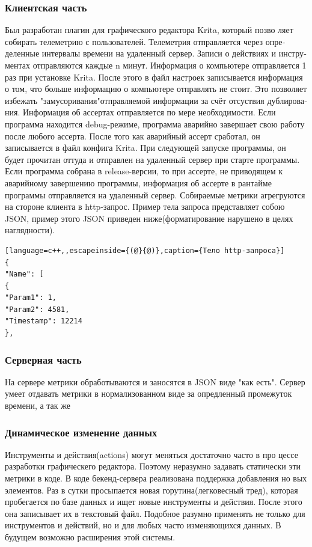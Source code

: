 \subsubsection{Клиентская часть}
Был разработан плагин для графического редактора Krita, который позво­
ляет собирать телеметрию с пользователей. Телеметрия отправляется через опре­
деленные интервалы времени на удаленный сервер. Записи о действиях и инстру­
ментах отправляются каждые n минут. Информация о компьютере отправляется 1
раз при установке Krita. После этого в файл настроек записывается информация
о том, что больше информацию о компьютере отправлять не стоит. Это позволяет
избежать "замусоривания"отправляемой информации за счёт отсуствия дублирова­
ния. Информация об ассертах отправляется по мере необходимости. Если программа
находится debug-режиме, программа аварийно завершает свою работу после любого
ассерта. После того как аварийный ассерт сработал, он записывается в файл конфига Krita. При следующей запуске программы, он будет прочитан оттуда и отправлен на удаленный сервер при старте программы. Если программа собрана в release-версии, то при ассерте, не приводящем к аварийному завершению программы, информация об ассерте в рантайме программы отправляется на удаленный сервер. Собираемые метрики агрегруются на стороне клиента в http-запрос. Пример тела запроса представляет собою JSON, пример этого JSON приведен ниже(форматирование нарушено в целях наглядности).
\begin{lstlisting}[language=c++,,escapeinside={(@}{@)},caption={Тело http-запроса}] 
{
"Name": [
{
"Param1": 1,
"Param2": 4581,
"Timestamp": 12214
},
\end{lstlisting}
\subsubsection{Серверная часть}
На сервере метрики обработываются и заносятся в JSON виде "как есть". 
Сервер умеет отдавать метрики в нормализованном виде за опредленный промежуток времени, а так же
\subsubsection{Динамическое изменение данных}
Инструменты и действия(actions) могут меняться достаточно часто в про­
цессе разработки графическего редактора. Поэтому неразумно задавать статически
эти метрики в коде. В коде бекенд-сервера реализована поддержка добавления но­
вых элементов. Раз в сутки просыпается новая горутина(легковесный тред), которая пробегается по базе данных и ищет новые инструменты и действия. После этого она записывает их в текстовый файл. Подобное разумно применять не только для инструментов и действий, но и для любых часто изменяющихся данных.  В будущем возможно расширения этой системы.